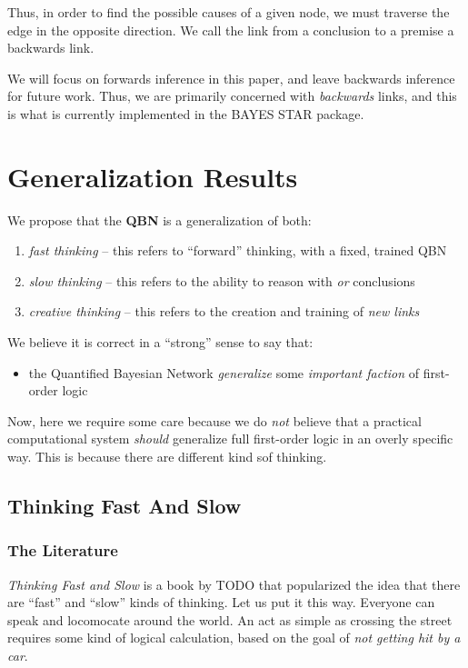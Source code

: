 \documentclass[12pt]{article}
\begin{document}
Thus, in order to find the possible causes of a given node, we must traverse the edge in the opposite direction.
We call the link from a conclusion to a premise a backwards link.

We will focus on forwards inference in this paper, and leave backwards inference for future work.
Thus, we are primarily concerned with \emph{backwards} links, and this is what is currently implemented in the BAYES STAR package.

\section{Generalization Results}
We propose that the {\bf QBN} is a generalization of both:
\begin{enumerate}
    \item {\em fast thinking} -- this refers to ``forward'' thinking, with a fixed, trained QBN
    \item {\em slow thinking} -- this refers to the ability to reason with {\em or} conclusions
    \item {\em creative thinking} -- this refers to the creation and training of {\em new links}
\end{enumerate}

We believe it is correct in a ``strong'' sense to say that:
\begin{itemize}
    \item the Quantified Bayesian Network {\em generalize} some {\em important faction} of first-order logic
\end{itemize}

Now, here we require some care because we do {\em not} believe that a practical computational system {\em should} generalize full first-order logic in an overly specific way.
This is because there are different kind sof thinking.

\subsection{Thinking Fast And Slow}
\subsubsection{The Literature}
{\em Thinking Fast and Slow} is a book by TODO that popularized the idea that there are ``fast'' and ``slow'' kinds of thinking.
Let us put it this way.
Everyone can speak and locomocate around the world.
An act as simple as crossing the street requires some kind of logical calculation, based on the goal of {\em not getting hit by a car}.
\end{document}

